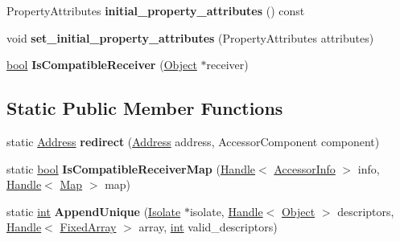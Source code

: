 \begin{DoxyCompactItemize}
\item 
\mbox{\label{classv8_1_1internal_1_1AccessorInfo_a5227934dc0ed67b3fc9bfaeec075dce1}} 
Property\+Attributes {\bfseries initial\+\_\+property\+\_\+attributes} () const
\item 
\mbox{\label{classv8_1_1internal_1_1AccessorInfo_a51a6ab406362f4132dd149ec1bc3b2f3}} 
void {\bfseries set\+\_\+initial\+\_\+property\+\_\+attributes} (Property\+Attributes attributes)
\item 
\mbox{\label{classv8_1_1internal_1_1AccessorInfo_af90ccc9b509016f749a5d69a29cebdf4}} 
\mbox{\hyperlink{classbool}{bool}} {\bfseries Is\+Compatible\+Receiver} (\mbox{\hyperlink{classv8_1_1internal_1_1Object}{Object}} $\ast$receiver)
\end{DoxyCompactItemize}
\subsection*{Static Public Member Functions}
\begin{DoxyCompactItemize}
\item 
\mbox{\label{classv8_1_1internal_1_1AccessorInfo_ae0638d82499bd7bc3b816c8744157291}} 
static \mbox{\hyperlink{classuintptr__t}{Address}} {\bfseries redirect} (\mbox{\hyperlink{classuintptr__t}{Address}} address, Accessor\+Component component)
\item 
\mbox{\label{classv8_1_1internal_1_1AccessorInfo_abd637250c18c0e918ff597f3aa464710}} 
static \mbox{\hyperlink{classbool}{bool}} {\bfseries Is\+Compatible\+Receiver\+Map} (\mbox{\hyperlink{classv8_1_1internal_1_1Handle}{Handle}}$<$ \mbox{\hyperlink{classv8_1_1internal_1_1AccessorInfo}{Accessor\+Info}} $>$ info, \mbox{\hyperlink{classv8_1_1internal_1_1Handle}{Handle}}$<$ \mbox{\hyperlink{classv8_1_1internal_1_1Map}{Map}} $>$ map)
\item 
\mbox{\label{classv8_1_1internal_1_1AccessorInfo_af87b3a434ca18d04913dcf6aa462b7c2}} 
static \mbox{\hyperlink{classint}{int}} {\bfseries Append\+Unique} (\mbox{\hyperlink{classv8_1_1internal_1_1Isolate}{Isolate}} $\ast$isolate, \mbox{\hyperlink{classv8_1_1internal_1_1Handle}{Handle}}$<$ \mbox{\hyperlink{classv8_1_1internal_1_1Object}{Object}} $>$ descriptors, \mbox{\hyperlink{classv8_1_1internal_1_1Handle}{Handle}}$<$ \mbox{\hyperlink{classv8_1_1internal_1_1FixedArray}{Fixed\+Array}} $>$ array, \mbox{\hyperlink{classint}{int}} valid\+\_\+descriptors)
\end{DoxyCompactItemize}
